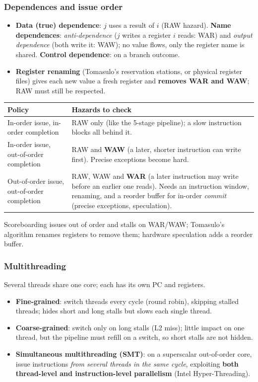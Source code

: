 \subsubsection{Dependences and issue order}
\begin{itemize}[leftmargin=*]
  \item \textbf{Data (true) dependence}: $j$ uses a result of $i$ (RAW hazard).
  \textbf{Name dependences}: \emph{anti-dependence} ($j$ writes a register $i$ reads:
  WAR) and \emph{output dependence} (both write it: WAW); no value flows, only the
  register name is shared. \textbf{Control dependence}: on a branch outcome.
  \item \textbf{Register renaming} (Tomasulo's reservation stations, or physical
  register files) gives each new value a fresh register and \textbf{removes WAR and
  WAW}; RAW must still be respected.
\end{itemize}
\begin{center}
\small
\begin{tabular}{@{}p{4.4cm}p{9.8cm}@{}}
\toprule
Policy & Hazards to check \\
\midrule
In-order issue, in-order completion & RAW only (like the 5-stage pipeline); a slow instruction blocks all behind it. \\
In-order issue, out-of-order completion & RAW and \textbf{WAW} (a later, shorter instruction can write first). Precise exceptions become hard. \\
Out-of-order issue, out-of-order completion & RAW, WAW and \textbf{WAR} (a later instruction may write before an earlier one reads). Needs an instruction window, renaming, and a reorder buffer for in-order \emph{commit} (precise exceptions, speculation). \\
\bottomrule
\end{tabular}
\end{center}
Scoreboarding issues out of order and stalls on WAR/WAW; Tomasulo's algorithm renames
registers to remove them; hardware speculation adds a reorder buffer.

\subsubsection{Multithreading}
Several threads share one core; each has its own PC and registers.
\begin{itemize}[leftmargin=*]
  \item \textbf{Fine-grained}: switch threads every cycle (round robin), skipping
  stalled threads; hides short and long stalls but slows each single thread.
  \item \textbf{Coarse-grained}: switch only on long stalls (L2 miss); little impact
  on one thread, but the pipeline must refill on a switch, so short stalls are not
  hidden.
  \item \textbf{Simultaneous multithreading (SMT)}: on a superscalar out-of-order
  core, issue instructions \emph{from several threads in the same cycle}, exploiting
  \textbf{both thread-level and instruction-level parallelism} (Intel
  Hyper-Threading).
\end{itemize}

